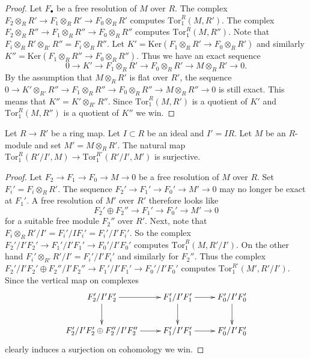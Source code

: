 \begin{proof}
Let $F_\bullet$ be a free resolution of $M$ over $R$.
The complex $F_2 \otimes_R R' \to F_1\otimes_R R' \to F_0 \otimes_R R'$
computes $\text{Tor}_1^R(M, R')$.
The complex $F_2 \otimes_R R'' \to F_1\otimes_R R'' \to F_0 \otimes_R R''$
computes $\text{Tor}_1^R(M, R'')$. Note that
$F_i \otimes_R R' \otimes_{R'} R'' = F_i \otimes_R R''$. Let
$K' = \text{Ker}(F_1\otimes_R R' \to F_0 \otimes_R R')$ and
similarly $K'' = \text{Ker}(F_1\otimes_R R'' \to F_0 \otimes_R R'')$.
Thus we have an exact sequence
$$
0 \to K' \to F_1\otimes_R R' \to F_0 \otimes_R R' \to M\otimes_R R' \to 0.
$$
By the assumption that $M\otimes_R R'$ is flat over $R'$,
the sequence $0 \to K' \otimes_{R'} R''
\to F_1 \otimes_R R'' \to F_0 \otimes_R R'' \to M\otimes_R R'' \to 0$
is still exact. This means that $K'' = K' \otimes_{R'} R''$.
Since $\text{Tor}_1^R(M, R')$ is a quotient of $K'$ and
$\text{Tor}_1^R(M, R'')$ is a quotient of $K''$ we win.
\end{proof}

\begin{lemma}
\label{lemma-surjective-on-tor-one-trivial}
Let $R \to R'$ be a ring map. Let $I \subset R$ be
an ideal and $I' = IR$. Let $M$ be an $R$-module
and set $M' = M \otimes_R R'$. The natural map
$\text{Tor}_1^R(R'/I', M) \to \text{Tor}_1^{R'}(R'/I', M')$
is surjective.
\end{lemma}

\begin{proof}
Let $F_2 \to F_1 \to F_0 \to M \to 0$ be a free resolution of
$M$ over $R$. Set $F_i' = F_i \otimes_R R'$. The sequence
$F_2' \to F_1' \to F_0' \to M' \to 0$ may no longer be exact
at $F_1'$. A free resolution of $M'$ over $R'$ therefore looks
like
$$
F_2' \oplus F_2'' \to F_1' \to F_0' \to M' \to 0
$$
for a suitable free module $F_2''$ over $R'$. Next, note that
$F_i \otimes_R R'/I' = F_i' / IF_i' = F_i'/I'F_i'$.
So the complex $F_2'/I'F_2' \to F_1'/I'F_1' \to F_0'/I'F_0'$
computes $\text{Tor}_1^R(M, R'/I')$. On the other hand
$F_i' \otimes_{R'} R'/I' = F_i'/I'F_i'$ and similarly
for $F_2''$. Thus the complex
$F_2'/I'F_2' \oplus F_2''/I'F_2'' \to F_1'/I'F_1' \to F_0'/I'F_0'$
computes $\text{Tor}_1^{R'}(M', R'/I')$. Since the vertical
map on complexes
$$
\xymatrix{
F_2'/I'F_2' \ar[r] \ar[d] &
F_1'/I'F_1' \ar[r] \ar[d] &
F_0'/I'F_0' \ar[d] \\
F_2'/I'F_2' \oplus F_2''/I'F_2'' \ar[r] &
F_1'/I'F_1' \ar[r] &
F_0'/I'F_0'
}
$$
clearly induces a surjection on cohomology we win.
\end{proof}

